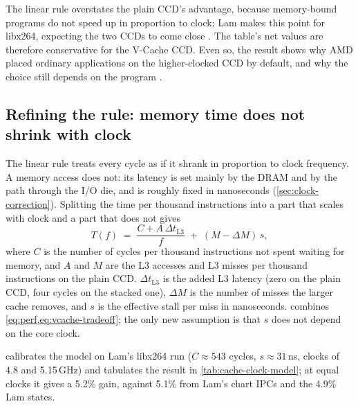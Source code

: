 The linear rule overstates the plain CCD's advantage, because memory-bound programs do not speed up in proportion to clock; Lam makes this point for libx264, expecting the two CCDs to come close \cite{lamAMDs7950X3DZen2023}. The table's net values are therefore conservative for the V-Cache CCD. Even so, the result shows why AMD placed ordinary applications on the higher-clocked CCD by default, and why the choice still depends on the program \cite{lamAMDs7950X3DZen2023}.

\subsection{Refining the rule: memory time does not shrink with clock}
\label{sec:cache-clock-model}
The linear rule treats every cycle as if it shrank in proportion to clock frequency. A memory access does not: its latency is set mainly by the DRAM and by the path through the I/O die, and is roughly fixed in nanoseconds (\cref{sec:clock-correction}). Splitting the time per thousand instructions into a part that scales with clock and a part that does not gives
\begin{equation}
  T(f) \;=\; \frac{C + A\,\Delta t_{\mathrm{L3}}}{f} \;+\; (M - \Delta M)\,s,
  \label{eq:cache-clock-model}
\end{equation}
where $C$ is the number of cycles per thousand instructions not spent waiting for memory, and $A$ and $M$ are the L3 accesses and L3 misses per thousand instructions on the plain CCD. $\Delta t_{\mathrm{L3}}$ is the added L3 latency (zero on the plain CCD, four cycles on the stacked one), $\Delta M$ is the number of misses the larger cache removes, and $s$ is the effective stall per miss in nanoseconds.  combines \cref{eq:perf,eq:vcache-tradeoff}; the only new assumption is that $s$ does not depend on the core clock.

 calibrates the model on Lam's libx264 run ($C \approx 543$ cycles, $s \approx 31$\,ns, clocks of 4.8 and 5.15\,GHz) and tabulates the result in \cref{tab:cache-clock-model}; at equal clocks it gives a 5.2\% gain, against 5.1\% from Lam's chart IPCs and the 4.9\% Lam states.

